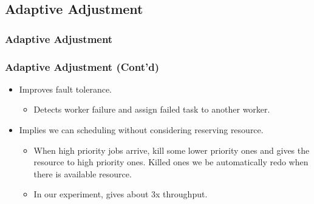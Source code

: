 \documentclass{beamer}
\begin{document}
\subsection{Adaptive Adjustment}
\begin{frame}
  \frametitle{Adaptive Adjustment}
\end{frame}
\begin{frame}
  \frametitle{Adaptive Adjustment (Cont'd)}
  \begin{itemize}
    \item Improves fault tolerance.
      \begin{itemize}
        \item Detects worker failure and assign failed task to another
          worker.
      \end{itemize}
    \item Implies we can scheduling without considering reserving resource.
      \begin{itemize}
        \item When high priority jobs arrive, kill some lower priority
          ones and gives the resource to high priority ones.  Killed
          ones we be automatically redo when there is available
          resource.
        \item In our experiment, gives about \alert{3x} throughput.
      \end{itemize}
  \end{itemize}
\end{frame}
\end{document}
